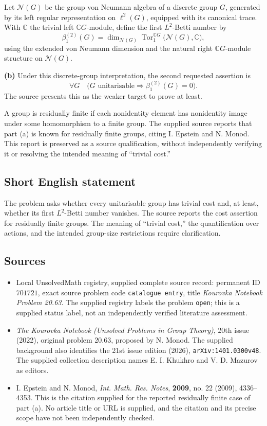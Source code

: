 \documentclass[11pt]{article}
\newcommand{\C}{\mathbb{C}}
\begin{document}
Let \(\mathcal N(G)\) be the group von Neumann algebra of a discrete group \(G\), generated by its left regular representation on \(\ell^2(G)\), equipped with its canonical trace. With \(\C\) the trivial left \(\C G\)-module, define the first \(L^2\)-Betti number by
\[
\beta_1^{(2)}(G)
=\dim_{\mathcal N(G)}
\operatorname{Tor}^{\C G}_1\bigl(\mathcal N(G),\C\bigr),
\]
using the extended von Neumann dimension and the natural right \(\C G\)-module structure on \(\mathcal N(G)\).

\textbf{(b)} Under this discrete-group interpretation, the second requested assertion is
\[
\forall G\quad
\bigl(G\text{ unitarisable}\Longrightarrow\beta_1^{(2)}(G)=0\bigr).
\]
The source presents this as the weaker target to prove at least.

A group is residually finite if each nonidentity element has nonidentity image under some homomorphism to a finite group. The supplied source reports that part (a) is known for residually finite groups, citing I. Epstein and N. Monod. This report is preserved as a source qualification, without independently verifying it or resolving the intended meaning of ``trivial cost.''
\subsection{Short English statement}
The problem asks whether every unitarisable group has trivial cost and, at least, whether its first \(L^2\)-Betti number vanishes. The source reports the cost assertion for residually finite groups. The meaning of ``trivial cost,'' the quantification over actions, and the intended group-size restrictions require clarification.
\subsection{Sources}
\begin{itemize}
\item Local UnsolvedMath registry, supplied complete source record: permanent ID \(701721\), exact source problem code \texttt{catalogue entry}, title \emph{Kourovka Notebook Problem 20.63}. The supplied registry labels the problem \texttt{open}; this is a supplied status label, not an independently verified literature assessment.
\item \emph{The Kourovka Notebook (Unsolved Problems in Group Theory)}, 20th issue (2022), original problem 20.63, proposed by N. Monod. The supplied background also identifies the 21st issue edition (2026), \texttt{arXiv:1401.0300v48}. The supplied collection description names E. I. Khukhro and V. D. Mazurov as editors.
\item I. Epstein and N. Monod, \emph{Int. Math. Res. Notes}, \textbf{2009}, no. 22 (2009), 4336--4353. This is the citation supplied for the reported residually finite case of part (a). No article title or URL is supplied, and the citation and its precise scope have not been independently checked.
\end{itemize}
\end{document}
